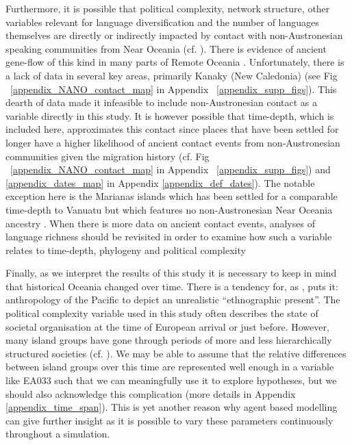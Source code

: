 \documentclass[unnumsec,webpdf,modern,medium]{oup-authoring-template}
\begin{document}
Furthermore, it is possible that political complexity, network structure, other variables relevant for language diversification and the number of languages themselves are directly or indirectly impacted by contact with non-Austronesian speaking communities from Near Oceania (cf. \citet{lynch1981melanesian}). There is evidence of ancient gene-flow of this kind in many parts of Remote Oceania \citep{posth_jena_ancient_dna_vanuatu_2018, lipson_harvad_ancient_dna_vanuatu_2018, liu2022ancient}. Unfortunately, there is a lack of data in several key areas, primarily Kanaky (New Caledonia) (see Fig ~\ref{appendix_NANO_contact_map} in Appendix ~\ref{appendix_supp_figs}). This dearth of data made it infeasible to include non-Austronesian contact as a variable directly in this study. It is however possible that time-depth, which is included here, approximates this contact since places that have been settled for longer have a higher likelihood of ancient contact events from non-Austronesian communities given the migration history (cf. Fig ~\ref{appendix_NANO_contact_map} in Appendix ~\ref{appendix_supp_figs}) and \ref{appendix_dates_map} in Appendix \ref{appendix_def_dates}). The notable exception here is the Marianas islands which has been settled for a comparable time-depth to Vanuatu but which features no non-Austronesian Near Oceania ancestry \citep{liu2022ancient}. When there is more data on ancient contact events, analyses of language richness should be revisited in order to examine how such a variable relates to time-depth, phylogeny and political complexity

Finally, as we interpret the results of this study it is necessary to keep in mind that historical Oceania changed over time. There is a tendency for, as \citet{meleisea1995}, puts it: anthropology of the Pacific to depict an unrealistic ``ethnographic present''. The political complexity variable used in this study often describes the state of societal organisation at the time of European arrival or just before. However, many island groups have gone through periods of more and less hierarchically structured societies (cf. \citet[178-183]{skirgaard2020multilevel}). We may be able to assume that the relative differences between island groups over this time are represented well enough in a variable like EA033 such that we can meaningfully use it to explore hypotheses, but we should also acknowledge this complication (more details in Appendix \ref{appendix_time_span}). This is yet another reason why agent based modelling can give further insight as it is possible to vary these parameters continuously throughout a simulation.
\end{document}
